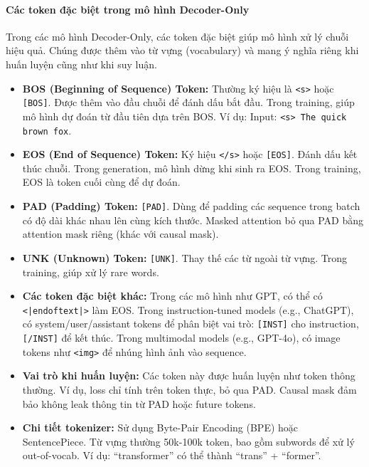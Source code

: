 \paragraph{Các token đặc biệt trong mô hình Decoder-Only}
Trong các mô hình Decoder-Only, các token đặc biệt giúp mô hình xử lý chuỗi hiệu quả. Chúng được thêm vào từ vựng (vocabulary) và mang ý nghĩa riêng khi huấn luyện cũng như khi suy luận.

\begin{itemize}
	\item \textbf{BOS (Beginning of Sequence) Token:} Thường ký hiệu là \texttt{<s>} hoặc \texttt{[BOS]}. Được thêm vào đầu chuỗi để đánh dấu bắt đầu. Trong training, giúp mô hình dự đoán từ đầu tiên dựa trên BOS. Ví dụ: Input: \texttt{<s> The quick brown fox}.
	\item \textbf{EOS (End of Sequence) Token:} Ký hiệu \texttt{</s>} hoặc \texttt{[EOS]}. Đánh dấu kết thúc chuỗi. Trong generation, mô hình dừng khi sinh ra EOS. Trong training, EOS là token cuối cùng để dự đoán.
	\item \textbf{PAD (Padding) Token:} \texttt{[PAD]}. Dùng để padding các sequence trong batch có độ dài khác nhau lên cùng kích thước. Masked attention bỏ qua PAD bằng attention mask riêng (khác với causal mask).
	\item \textbf{UNK (Unknown) Token:} \texttt{[UNK]}. Thay thế các từ ngoài từ vựng. Trong training, giúp xử lý rare words.
	\item \textbf{Các token đặc biệt khác:} Trong các mô hình như GPT, có thể có \texttt{<|endoftext|>} làm EOS. Trong instruction-tuned models (e.g., ChatGPT), có system/user/assistant tokens để phân biệt vai trò: \texttt{[INST]} cho instruction, \texttt{[/INST]} để kết thúc. Trong multimodal models (e.g., GPT-4o), có image tokens như \texttt{<img>} để nhúng hình ảnh vào sequence.
	\item \textbf{Vai trò khi huấn luyện:} Các token này được huấn luyện như token thông thường. Ví dụ, loss chỉ tính trên token thực, bỏ qua PAD. Causal mask đảm bảo không leak thông tin từ PAD hoặc future tokens.
	\item \textbf{Chi tiết tokenizer:} Sử dụng Byte-Pair Encoding (BPE) hoặc SentencePiece. Từ vựng thường 50k-100k token, bao gồm subwords để xử lý out-of-vocab. Ví dụ: “transformer” có thể thành “trans” + “former”.
\end{itemize}

